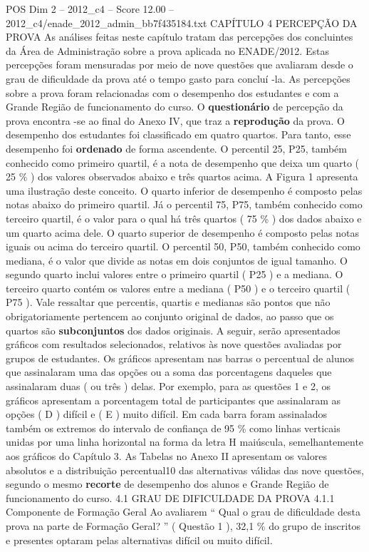 \begin{textsample}{POS Dim 2 – 2012\_c4 – Score 12.00 – 2012\_c4/enade\_2012\_admin\_bb7f435184.txt}  \label{ex:f2_pos_102}
CAPÍTULO 4 PERCEPÇÃO DA PROVA As análises feitas neste capítulo tratam das percepções dos concluintes da Área de Administração sobre a prova aplicada no ENADE/2012.
Estas percepções foram mensuradas por meio de nove questões que avaliaram desde o grau de dificuldade da prova até o tempo gasto para concluí -la.
As percepções sobre a prova foram relacionadas com o desempenho dos estudantes e com a Grande Região de funcionamento do curso.
O \textbf{questionário} de percepção da prova encontra -se ao final do Anexo IV, que traz a \textbf{reprodução} da prova.
O desempenho dos estudantes foi classificado em quatro quartos.
Para tanto, esse desempenho foi \textbf{ordenado} de forma ascendente.
O percentil 25, P25, também conhecido como primeiro quartil, é a nota de desempenho que deixa um quarto ( 25 \% ) dos valores observados abaixo e três quartos acima.
A Figura 1 apresenta uma ilustração deste conceito.
O quarto inferior de desempenho é composto pelas notas abaixo do primeiro quartil.
Já o percentil 75, P75, também conhecido como terceiro quartil, é o valor para o qual há três quartos ( 75 \% ) dos dados abaixo e um quarto acima dele.
O quarto superior de desempenho é composto pelas notas iguais ou acima do terceiro quartil.
O percentil 50, P50, também conhecido como mediana, é o valor que divide as notas em dois conjuntos de igual tamanho.
O segundo quarto inclui valores entre o primeiro quartil ( P25 ) e a mediana.
O terceiro quarto contém os valores entre a mediana ( P50 ) e o terceiro quartil ( P75 ).
Vale ressaltar que percentis, quartis e medianas são pontos que não obrigatoriamente pertencem ao conjunto original de dados, ao passo que os quartos são \textbf{subconjuntos} dos dados originais.
A seguir, serão apresentados gráficos com resultados selecionados, relativos às nove questões avaliadas por grupos de estudantes.
Os gráficos apresentam nas barras o percentual de alunos que assinalaram uma das opções ou a soma das porcentagens daqueles que assinalaram duas ( ou três ) delas.
Por exemplo, para as questões 1 e 2, os gráficos apresentam a porcentagem total de participantes que assinalaram as opções ( D ) difícil e ( E ) muito difícil.
Em cada barra foram assinalados também os extremos do intervalo de confiança de 95 \% como linhas verticais unidas por uma linha horizontal na forma da letra H maiúscula, semelhantemente aos gráficos do Capítulo 3.
As Tabelas no Anexo II apresentam os valores absolutos e a distribuição percentual10 das alternativas válidas das nove questões, segundo o mesmo \textbf{recorte} de desempenho dos alunos e Grande Região de funcionamento do curso. 4.1 GRAU DE DIFICULDADE DA PROVA 4.1.1 Componente de Formação Geral Ao avaliarem “ Qual o grau de dificuldade desta prova na parte de Formação Geral? ” ( Questão 1 ), 32,1 \% do grupo de inscritos e presentes optaram pelas alternativas difícil ou muito difícil.

\end{textsample}
